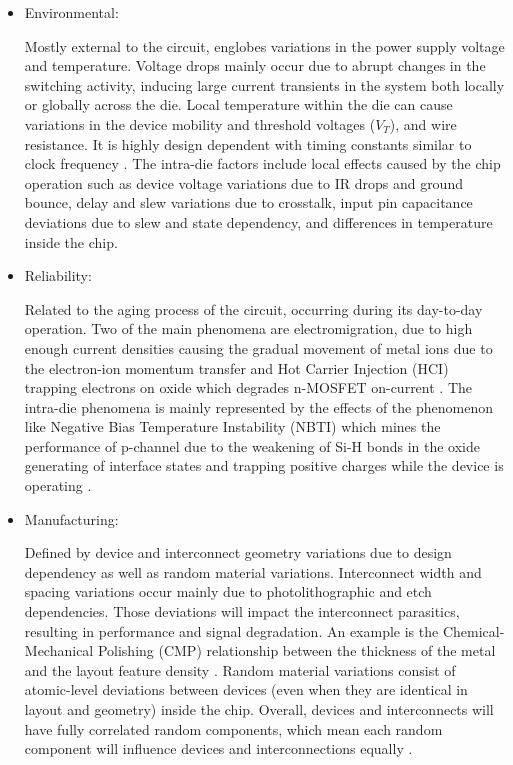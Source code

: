 \documentclass[pgmicro,diss,english]{iiufrgs}
\begin{document}
\begin{itemize}

\item Environmental:

		Mostly external to the circuit, englobes variations in the power supply voltage and temperature. Voltage drops mainly occur due to abrupt changes in the switching activity, inducing large current transients in the system both locally or globally across the die. Local temperature within the die can cause variations in the device mobility and threshold voltages ($V_T$), and wire resistance. It is highly design dependent with timing constants similar to clock frequency \cite{nassif:08} \cite{bernstein2006high}. The intra-die factors include local effects caused by the chip operation such as device voltage variations due to IR drops and ground bounce, delay and slew variations due to crosstalk, input pin capacitance deviations due to slew and state dependency, and differences in temperature inside the chip.

\item Reliability:

	Related to the aging process of the circuit, occurring during its day-to-day operation. Two of the main phenomena are electromigration, due to high enough current densities causing the gradual movement of metal ions due to the electron-ion momentum transfer \cite{young1994failure} \cite{posser2016electromigration} and Hot Carrier Injection (HCI) trapping electrons on oxide which degrades n-MOSFET on-current \cite{takeda1983empirical} \cite{nassif:08} \cite{bernstein2006high}. The intra-die phenomena is mainly represented by the effects of the phenomenon like Negative Bias Temperature Instability (NBTI) which mines the performance of p-channel due to the weakening of Si-H bonds in the oxide generating of interface states and trapping positive charges while the device is operating \cite{wang2008statistical}.

\item Manufacturing:

Defined by device and interconnect geometry variations due to design dependency as well as random material variations. Interconnect width and spacing variations occur mainly due to photolithographic and etch dependencies. Those deviations will impact the interconnect parasitics, resulting in performance and signal degradation. An example is the Chemical-Mechanical Polishing (CMP) relationship between the thickness of the metal and the layout feature density \cite{stine1997analysis}.  Random material variations consist of atomic-level deviations between devices (even when they are identical in layout and geometry) inside the chip. Overall, devices and interconnects will have fully correlated random components, which mean each random component will influence devices and interconnections equally \cite{dietrich2011process}.


\end{itemize}
\end{document}
